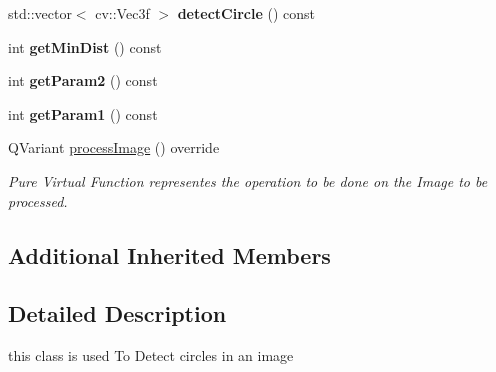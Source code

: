 \begin{DoxyCompactItemize}
\mbox{\label{class_image_processor_1_1_detect_circle_a391f7d6e95895d778093c84112eef561}} 
std\+::vector$<$ cv\+::\+Vec3f $>$ {\bfseries detect\+Circle} () const
\item 
\mbox{\label{class_image_processor_1_1_detect_circle_ae6477945f825e5d3e325024fd84b4096}} 
int {\bfseries get\+Min\+Dist} () const
\item 
\mbox{\label{class_image_processor_1_1_detect_circle_a8611cbc8bd0e5416983641f7f683b660}} 
int {\bfseries get\+Param2} () const
\item 
\mbox{\label{class_image_processor_1_1_detect_circle_a8b2b83d109d8c929e2510c93b47927f9}} 
int {\bfseries get\+Param1} () const
\item 
Q\+Variant \hyperlink{class_image_processor_1_1_detect_circle_ae59a596ca1e992a8d8f859b5f79239f5}{process\+Image} () override
\begin{DoxyCompactList}\small\item\em Pure Virtual Function representes the operation to be done on the Image to be processed. \end{DoxyCompactList}\end{DoxyCompactItemize}
\subsection*{Additional Inherited Members}


\subsection{Detailed Description}
this class is used To Detect circles in an image 

